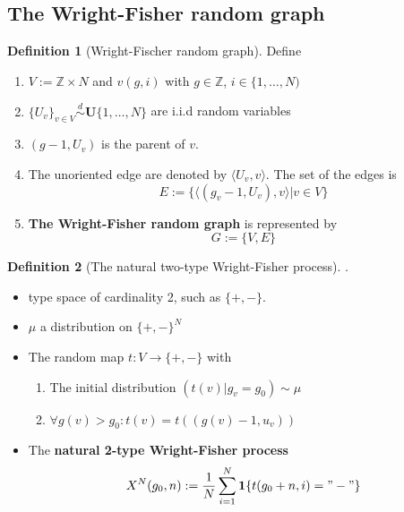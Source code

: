 \documentclass[a4paper,11pt]{book}
\theoremstyle{definition}
\newtheorem{definition}{Definition}[section]
\theoremstyle{remark}
\begin{document}
\subsection{The Wright-Fisher random graph}
\begin{definition}[Wright-Fischer random graph]
	Define
	\begin{enumerate}
		\item $V:= \mathbb{Z} \times N$ and $v(g, i)$ with $g \in \mathbb{Z}$, $i \in \{1, \dots, N)$
		\item $\{U_v\}_{v \in V} \overset{d}{\sim} \textbf{U}\{1, \dots, N \}$ are i.i.d random variables
		\item $(g - 1, U_v)$ is the parent of $v$.
		\item The unoriented edge are denoted by $\langle U_v, v \rangle$. The set of the edges is  
			\begin{equation*}
				E:= \{\langle (g_v - 1, U_v), v \rangle | v \in V \}
			\end{equation*}
		\item \textbf{The Wright-Fisher random graph} is represented by 
		 \begin{equation*}
		 	 G := \{V, E\}
		 \end{equation*}
	\end{enumerate}
\end{definition}

\begin{definition}[The natural two-type Wright-Fisher process].
\begin{itemize}
	\item type space of cardinality 2, such as $\{+, - \}$.
	\item $\mu$ a distribution on $\{+ , -\}^N$
	\item The random map $t: V \rightarrow \{+, -\}$ with 
	\begin{enumerate}
		\item The initial distribution $(t(v) | g_{v} = g_0 ) \sim \mu$
		\item $\forall g(v) > g_0: t(v) = t((g(v) - 1, u_v))$
	\end{enumerate}
	\item The \textbf{natural 2-type Wright-Fisher process}
	\begin{equation*}
		X^N(g_0, n) := \frac{1}{N}\sum_{i = 1}^N \textbf{1}\{t(g_0 + n, i) = "-"\}
	\end{equation*}
\end{itemize}
\end{definition}
\end{document}
